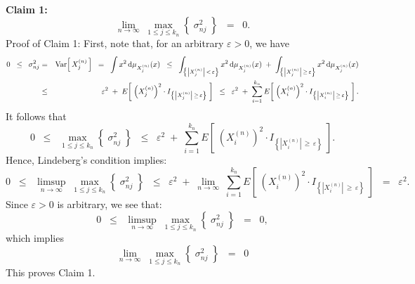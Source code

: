 \vskip 0.5cm
\noindent
\textbf{Claim 1:}
\begin{equation*}
\lim_{n\rightarrow\infty}\;\max_{1\leq j \leq k_{n}}\left\{\; \sigma^{2}_{nj} \;\right\}
\;\;=\;\; 0.
\end{equation*}
{\small Proof of Claim 1:
First, note that, for an arbitrary $\varepsilon > 0$, we have
\begin{eqnarray*}
0 \;\;\leq\;\;
\sigma^{2}_{nj}
&=& \textnormal{Var}\!\left[\,X^{(n)}_{j}\,\right]
\;\;=\;\; \int x^{2}\,\textnormal{d}\mu_{X^{(n)}_{j}}(x)
\;\;\leq\;\;  \int_{\left\{\left\vert X^{(n)}_{j}\right\vert\,<\,\varepsilon\right\}}x^{2}\,\textnormal{d}\mu_{X^{(n)}_{j}}(x)
\;+\;  \int_{\left\{\left\vert X^{(n)}_{j}\right\vert\,\geq\,\varepsilon\right\}}x^{2}\,\textnormal{d}\mu_{X^{(n)}_{j}}(x)
\\
&\leq& \varepsilon^{2}
\;+\; E\!\left[\;\left(X^{(n)}_{j}\right)^{2}\cdot I_{\left\{\left\vert X^{(n)}_{j}\right\vert\,\geq\,\varepsilon\right\}}\;\right]
\;\;\leq\;\; \varepsilon^{2}
\;+\; \sum_{i=1}^{k_{n}}E\!\left[\;\left(X^{(n)}_{i}\right)^{2}\cdot I_{\left\{\left\vert X^{(n)}_{i}\right\vert\,\geq\,\varepsilon\right\}}\;\right].
\end{eqnarray*}
It follows that
\begin{equation*}
0 \;\;\leq\;\;
\max_{1 \leq j \leq k_{n}}\left\{\;\sigma^{2}_{nj}\;\right\}
\;\;\leq\;\; \varepsilon^{2}
\;+\; \sum_{i=1}^{k_{n}}E\!\left[\;\left(X^{(n)}_{i}\right)^{2}\cdot I_{\left\{\left\vert X^{(n)}_{i}\right\vert\,\geq\,\varepsilon\right\}}\;\right].
\end{equation*}
Hence, Lindeberg's condition implies:
\begin{equation*}
0 \;\;\leq\;\;
\limsup_{n\rightarrow\infty}\;\max_{1 \leq j \leq k_{n}}\left\{\;\sigma^{2}_{nj}\;\right\}
\;\;\leq\;\; \varepsilon^{2}
\;+\; \lim_{n\rightarrow\infty}\;\sum_{i=1}^{k_{n}}E\!\left[\;\left(X^{(n)}_{i}\right)^{2}\cdot I_{\left\{\left\vert X^{(n)}_{i}\right\vert\,\geq\,\varepsilon\right\}}\;\right]
\;\;=\;\; \varepsilon^{2}.
\end{equation*}
Since $\varepsilon > 0$ is arbitrary, we see that:
\begin{equation*}
0 \;\;\leq\;\;
\limsup_{n\rightarrow\infty}\;\max_{1 \leq j \leq k_{n}}\left\{\;\sigma^{2}_{nj}\;\right\}
\;\;=\;\; 0,
\end{equation*}
which implies
\begin{equation*}
\lim_{n\rightarrow\infty}\;\max_{1 \leq j \leq k_{n}}\left\{\;\sigma^{2}_{nj}\;\right\}
\;\;=\;\; 0
\end{equation*}
This proves Claim 1.
}

